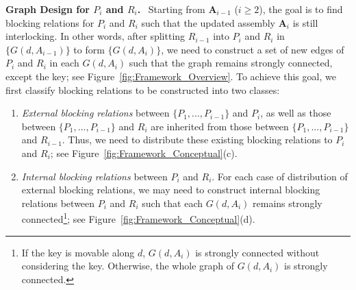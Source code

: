 \vspace*{1.0mm}
\noindent
{\bf Graph Design for $P_i$ and $R_i$.}  \
Starting from $\mathbf{A}_{i-1}$ ($i \geq 2$),  the goal is to find blocking relations for $P_i$ and $R_i$  such that the updated assembly $\mathbf{A}_{i}$ is still interlocking.
In other words, after splitting $R_{i-1}$ into $P_i$ and $R_i$ in $\{G(d, A_{i-1})\}$ to form $\{G(d, A_i)\}$, we need to construct a set of new edges of $P_i$ and $R_i$ in each $G(d, A_i)$ such that the graph remains strongly connected, except the key; see Figure~\ref{fig:Framework_Overview}.
To achieve this goal, we first classify blocking relations to be constructed into two classes:
\begin{enumerate}[label=(\roman*), leftmargin=*]
	\vspace*{-0.5mm}
	\item
	{\em External blocking relations} between $\{P_1, ..., P_{i-1}\}$ and $P_i$, as well as those between $\{P_1, ..., P_{i-1}\}$ and $R_i$ are inherited from those between  $\{P_1, ..., P_{i-1}\}$ and $R_{i-1}$.
	Thus, we need to distribute these existing blocking relations to $P_i$ and $R_i$; see Figure~\ref{fig:Framework_Conceptual}(c).
	
	\vspace*{0.5mm}
	\item
	{\em Internal blocking relations} between $P_i$ and $R_i$.
	For each case of distribution of external blocking relations, we may need to construct internal blocking relations between $P_i$ and $R_i$ such that each $G(d, A_i)$ remains strongly connected\footnote
	{If the key is movable along $d$, $G(d, A_i)$ is strongly connected without considering the key. Otherwise, the whole graph of $G(d, A_i)$ is strongly connected.}; see Figure~\ref{fig:Framework_Conceptual}(d).
	
\end{enumerate}	


